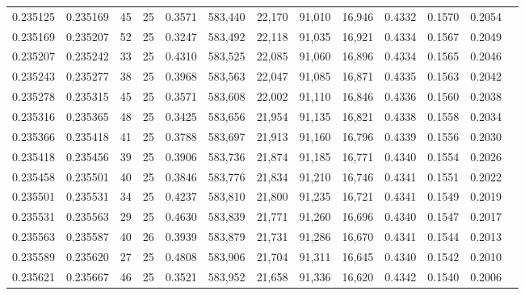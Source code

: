 \begin{tabular}{rrrrrrrrrrrrr}
0.235125 & 0.235169 &    45 &  25 &                                     0.3571 & 583,440 &  22,170 &  91,010 &  16,946 & 0.4332 & 0.1570 & 0.2054 \\
0.235169 & 0.235207 &    52 &  25 &                                     0.3247 & 583,492 &  22,118 &  91,035 &  16,921 & 0.4334 & 0.1567 & 0.2049 \\
0.235207 & 0.235242 &    33 &  25 &                                     0.4310 & 583,525 &  22,085 &  91,060 &  16,896 & 0.4334 & 0.1565 & 0.2046 \\
0.235243 & 0.235277 &    38 &  25 &                                     0.3968 & 583,563 &  22,047 &  91,085 &  16,871 & 0.4335 & 0.1563 & 0.2042 \\
0.235278 & 0.235315 &    45 &  25 &                                     0.3571 & 583,608 &  22,002 &  91,110 &  16,846 & 0.4336 & 0.1560 & 0.2038 \\
0.235316 & 0.235365 &    48 &  25 &                                     0.3425 & 583,656 &  21,954 &  91,135 &  16,821 & 0.4338 & 0.1558 & 0.2034 \\
0.235366 & 0.235418 &    41 &  25 &                                     0.3788 & 583,697 &  21,913 &  91,160 &  16,796 & 0.4339 & 0.1556 & 0.2030 \\
0.235418 & 0.235456 &    39 &  25 &                                     0.3906 & 583,736 &  21,874 &  91,185 &  16,771 & 0.4340 & 0.1554 & 0.2026 \\
0.235458 & 0.235501 &    40 &  25 &                                     0.3846 & 583,776 &  21,834 &  91,210 &  16,746 & 0.4341 & 0.1551 & 0.2022 \\
0.235501 & 0.235531 &    34 &  25 &                                     0.4237 & 583,810 &  21,800 &  91,235 &  16,721 & 0.4341 & 0.1549 & 0.2019 \\
0.235531 & 0.235563 &    29 &  25 &                                     0.4630 & 583,839 &  21,771 &  91,260 &  16,696 & 0.4340 & 0.1547 & 0.2017 \\
0.235563 & 0.235587 &    40 &  26 &                                     0.3939 & 583,879 &  21,731 &  91,286 &  16,670 & 0.4341 & 0.1544 & 0.2013 \\
0.235589 & 0.235620 &    27 &  25 &                                     0.4808 & 583,906 &  21,704 &  91,311 &  16,645 & 0.4340 & 0.1542 & 0.2010 \\
0.235621 & 0.235667 &    46 &  25 &                                     0.3521 & 583,952 &  21,658 &  91,336 &  16,620 & 0.4342 & 0.1540 & 0.2006 \\

\end{tabular}

